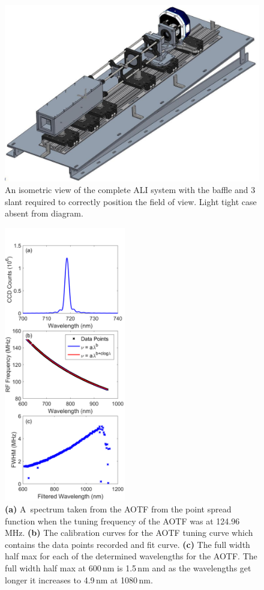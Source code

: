 \documentclass[amtd, online, hvmath]{copernicus}
\providecommand{\DIFaddbeginFL}{} %
\providecommand{\DIFaddendFL}{} %
\providecommand{\DIFdelbeginFL}{} %
\providecommand{\DIFdelendFL}{} %
\begin{document}
\begin{figure}
\includegraphics[width=120mm]{amt-2015-329-discussions-f05.pdf}
\caption{An isometric view of the complete ALI system with the baffle
  and 3{\degree} slant required to correctly position the field of
  view. Light tight case absent from diagram.}
\label{amtd-2015-0329-f05.pdf}
\end{figure}

\begin{figure}
\DIFdelbeginFL %
\DIFdelendFL \DIFaddbeginFL \includegraphics[height=120mm]{amt-2015-329-discussions-f06.pdf}
\DIFaddendFL \caption{\textbf{(a)} A~spectrum taken from the AOTF from the point
  spread function when the tuning frequency of the AOTF was at
  124.96\,\unit{MHz}. \textbf{(b)} The calibration curves for the AOTF
  tuning curve which contains the data points recorded and fit
  curve. \textbf{(c)} The full width half max for each of the
  determined wavelengths for the AOTF. The full width half max at
  600\,\unit{nm} is 1.5\,\unit{nm} and as the wavelengths get longer
  it increases to 4.9\,\unit{nm} at 1080\,\unit{nm}.}
\label{amtd-2015-0329-f06.pdf}
\end{figure}
\end{document}

